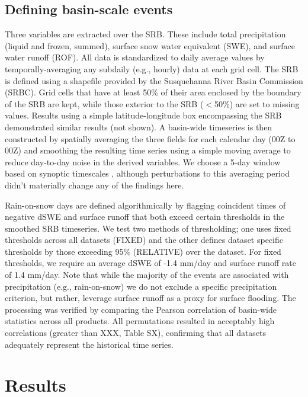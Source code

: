 \documentclass[draft]{agujournal2019}
\begin{document}
\subsection{Defining basin-scale events}

Three variables are extracted over the SRB. These include total precipitation (liquid and frozen, summed), surface snow water equivalent (SWE), and surface water runoff (ROF). All data is standardized to daily average values by temporally-averaging any subdaily (e.g., hourly) data at each grid cell. The SRB is defined using a shapefile provided by the Susquehanna River Basin Commission (SRBC). Grid cells that have at least 50\% of their area enclosed by the boundary of the SRB are kept, while those exterior to the SRB ($<$50\%) are set to missing values. Results using a simple latitude-longitude box encompassing the SRB demonstrated similar results (not shown). A basin-wide timeseries is then constructed by spatially averaging the three fields for each calendar day (00Z to 00Z) and smoothing the resulting time series using a simple moving average to reduce day-to-day noise in the derived variables. We choose a 5-day window based on synoptic timescales \citep{holton2004introduction}, although perturbations to this averaging period didn't materially change any of the findings here.

Rain-on-snow days are defined algorithmically by flagging coincident times of negative dSWE and surface runoff that both exceed certain thresholds in the smoothed SRB timeseries. We test two methods of thresholding; one uses fixed thresholds across all datasets (FIXED) and the other defines dataset specific thresholds by those exceeding 95\% (RELATIVE) over the dataset. For fixed thresholds, we require an average dSWE of -1.4 mm/day and surface runoff rate of 1.4 mm/day. Note that while the majority of the events are associated with precipitation (e.g., rain-on-snow) we do not exclude a specific precipitation criterion, but rather, leverage surface runoff as a proxy for surface flooding. The processing was verified by comparing the Pearson correlation of basin-wide statistics across all products. All permutations resulted in acceptably high correlations (greater than XXX, Table SX), confirming that all datasets adequately represent the historical time series.

\section{Results}
\end{document}
